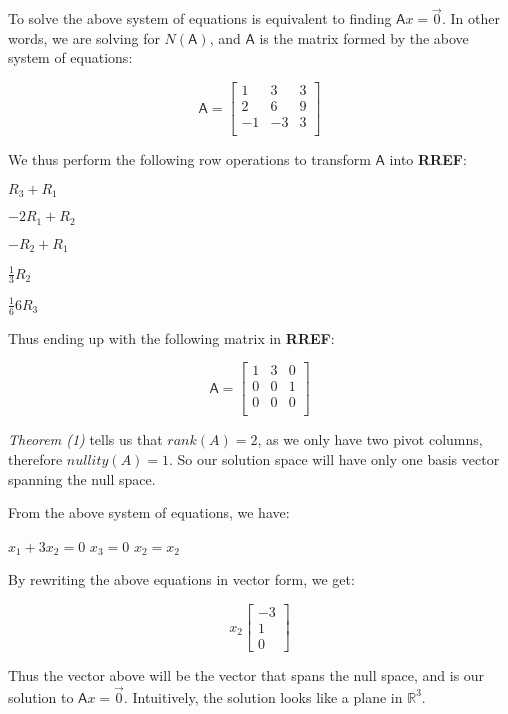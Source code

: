 \documentclass[a4paper, 11pt]{article}
\newcommand{\mat}[1]{\boldsymbol { \mathsf{#1}} }
\begin{document}
\begin{enumerate}
To solve the above system of equations is equivalent to finding $\mat{A}x = \vec{0}$. In other words, we are solving for $N(\mat{A})$, and $\mat{A}$ is the matrix formed by the above system of equations:

\begin{equation*}
    \mat{A} =
    \begin{bmatrix}
    1 & 3 & 3 \\
    2 & 6 & 9 \\
    -1 & -3 & 3 \\
    \end{bmatrix}
\end{equation*}

We thus perform the following row operations to transform $\mat{A}$ into \textbf{RREF}: 

\begin{center}
$R_3 + R_1$

$-2R_1 + R_2$

$-R_2 + R_1$

$\frac{1}{3}R_2$

$\frac{1}{6}6R_3$

\end{center}

Thus ending up with the following matrix in \textbf{RREF}:

\begin{equation*}
    \mat{A} =
    \begin{bmatrix}
    1 & 3 & 0 \\
    0 & 0 & 1 \\
    0 & 0 & 0 \\
    \end{bmatrix}
\end{equation*}

\textit{Theorem (1)} tells us that $rank(A) = 2$, as we only have two pivot columns, therefore $nullity(A) = 1$. So our solution space will have only one basis vector spanning the null space.

From the above system of equations, we have:

\begin{center}
	$x_1 + 3x_2 = 0$
	$x_3 = 0$
	$x_2 = x_2$
\end{center}

By rewriting the above equations in vector form, we get:

\begin{equation*}
	x_2 \begin{bmatrix}
	-3 \\
	1 \\
	0 \
	\end{bmatrix}
\end{equation*}

	Thus the vector above will be the vector that spans the null space, and is our solution to $\mat{A}x = \vec{0}$. Intuitively, the solution looks like a plane in $\mathds{R}^3$.

\end{enumerate}
\end{document}
